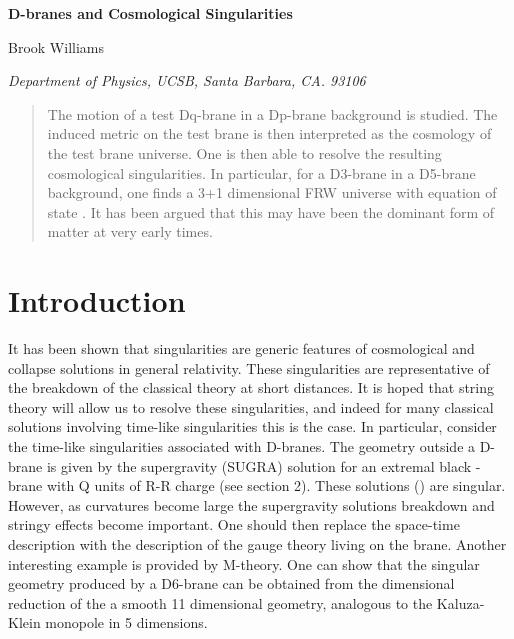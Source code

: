 \documentclass[a4paper,12pt]{article}
\providecommand{\ed}{\varepsilon}
\begin{document}
\renewcommand{\theequation}{\thesection.\arabic{equation}}
\begin{titlepage}
\bigskip
\rightline{} 
\bigskip\bigskip\bigskip\bigskip
\centerline{\Large \bf {D-branes and Cosmological Singularities}}
\bigskip\bigskip
\bigskip\bigskip

\centerline{\large Brook Williams}
\bigskip\bigskip
\centerline{\em Department of Physics, UCSB, Santa Barbara, CA. 93106}

\begin{abstract}
The motion of a test Dq-brane in a Dp-brane background is studied.
The induced metric on the test brane is then interpreted as the
cosmology of the test brane universe.  One is then able to resolve
the resulting cosmological singularities.  In particular, 
for a D3-brane in a D5-brane background, one finds a 3+1
dimensional FRW universe with equation of state \myHighlight{$p = \ed$}\coordHE{}.  It has
been argued that this may have been the dominant form of matter at
very early times. 

\noindent
\end{abstract}
\end{titlepage}
\baselineskip=18pt \setcounter{footnote}{0}

%
%
%
\section{Introduction}
%
%
%
It has been shown that singularities are generic features of
cosmological and collapse solutions in general relativity.  These
singularities are representative of the breakdown of the classical
theory at short distances.  It is hoped that string theory will allow
us to resolve these singularities, and indeed for many classical
solutions involving time-like singularities this is the case.
In particular, consider the time-like singularities associated with
D-branes.  The geometry outside a D-brane is given by the supergravity (SUGRA)
solution for an extremal black \coordHE{}-brane with Q units of R-R charge
(see section 2).
These solutions (\coordHE{}) are singular.  However, as curvatures
become large the supergravity solutions breakdown and 
stringy effects become important.  One should then replace 
the space-time description with
the description of the gauge theory living on the brane.  Another
interesting example is provided by M-theory.  One
can show that the singular geometry produced by a D6-brane can be
obtained from the dimensional reduction of the a smooth 11
dimensional geometry, analogous to the Kaluza-Klein monopole in 5 dimensions.
\end{document}
